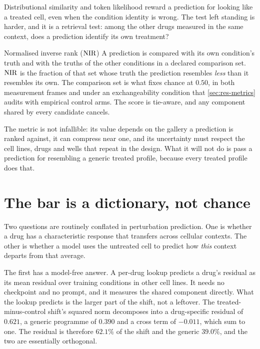 Distributional similarity and token likelihood reward a prediction for looking
like a treated cell, even when the condition identity is wrong. The test left
standing is harder, and it is a retrieval test: among the other drugs measured
in the same context, does a prediction identify its own treatment?

\begin{defn}{Normalised inverse rank ($\textrm{NIR}$)}
A prediction is compared with its own condition's truth and with the truths of
the other conditions in a declared comparison set. $\textrm{NIR}$ is the fraction of that
set whose truth the prediction resembles \emph{less} than it resembles its own.
The comparison set is what fixes chance at $0.50$, in both measurement frames and
under an exchangeability condition that \cref{sec:res-metrics} audits with
empirical control arms. The score is tie-aware, and any component shared by every
candidate cancels.
\end{defn}

The metric is not infallible: its value depends on the gallery a prediction is
ranked against, it can compress near one, and its uncertainty must respect the
cell lines, drugs and wells that repeat in the design. What it will not do is
pass a prediction for resembling a generic treated profile, because every
treated profile does that.

\section{The bar is a dictionary, not chance}
\label{sec:intro-bar}

Two questions are routinely conflated in perturbation prediction. One is whether
a drug has a characteristic response that transfers across cellular contexts.
The other is whether a model uses the untreated cell to predict how \emph{this}
context departs from that average.

The first has a model-free answer. A per-drug lookup predicts a
drug's residual as its mean residual over training conditions in other cell
lines. It needs no checkpoint and no prompt, and it measures the shared
component directly. What the lookup predicts is the larger part of the shift, not a leftover. The
treated-minus-control shift's squared norm decomposes into a drug-specific
residual of $0.621$, a generic programme of $0.390$ and a cross term of
$-0.011$, which sum to one. The residual is therefore $62.1\%$ of the shift and
the generic $39.0\%$, and the two are essentially orthogonal.

